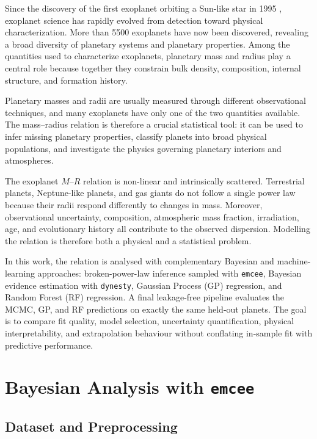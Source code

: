 \documentclass{article}
\numberwithin{equation}{section}
\begin{document}
Since the discovery of the first exoplanet orbiting a Sun-like star in 1995 \cite{mayor1995jupiter}, exoplanet science has rapidly evolved from detection toward physical characterization. More than 5500 exoplanets have now been discovered, revealing a broad diversity of planetary systems and planetary properties. Among the quantities used to characterize exoplanets, planetary mass and radius play a central role because together they constrain bulk density, composition, internal structure, and formation history.

Planetary masses and radii are usually measured through different observational techniques, and many exoplanets have only one of the two quantities available. The mass--radius relation is therefore a crucial statistical tool: it can be used to infer missing planetary properties, classify planets into broad physical populations, and investigate the physics governing planetary interiors and atmospheres.

The exoplanet $M$--$R$ relation is non-linear and intrinsically scattered. Terrestrial planets, Neptune-like planets, and gas giants do not follow a single power law because their radii respond differently to changes in mass. Moreover, observational uncertainty, composition, atmospheric mass fraction, irradiation, age, and evolutionary history all contribute to the observed dispersion. Modelling the relation is therefore both a physical and a statistical problem.

In this work, the relation is analysed with complementary Bayesian and machine-learning approaches: broken-power-law inference sampled with \texttt{emcee}, Bayesian evidence estimation with \texttt{dynesty}, Gaussian Process (GP) regression, and Random Forest (RF) regression. A final leakage-free pipeline evaluates the MCMC, GP, and RF predictions on exactly the same held-out planets. The goal is to compare fit quality, model selection, uncertainty quantification, physical interpretability, and extrapolation behaviour without conflating in-sample fit with predictive performance.

\section{Bayesian Analysis with \texttt{emcee}}

\subsection{Dataset and Preprocessing}
\end{document}
